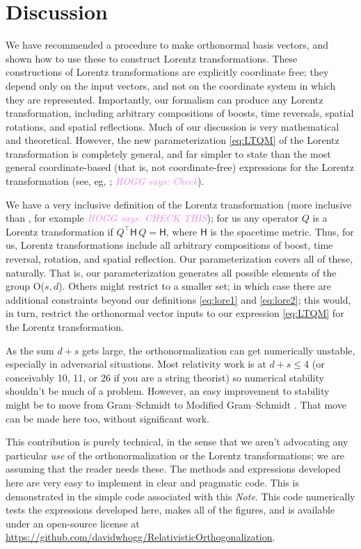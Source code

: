 \documentclass{article}
\newcommand{\metric}{\mathsf{H}}
\newcommand{\documentname}{\textsl{Note}}
\newcommand{\HOGG}[1]{\textcolor{violet}{\textsl{HOGG says: {#1}}}}
\begin{document}
\section{Discussion}\label{sec:discussion}

We have recommended a procedure to make orthonormal basis vectors, and shown how to use these to construct Lorentz transformations.
These constructions of Lorentz transformations are explicitly coordinate free; they depend only on the input vectors, and not on the coordinate system in which they are represented.
Importantly, our formalism can produce any Lorentz transformation, including arbitrary compositions of boosts, time reversals, spatial rotations, and spatial reflections.
Much of our discussion is very mathematical and theoretical.
However, the new parameterization \eqref{eq:LTQM} of the Lorentz transformation is completely general, and far simpler to state than the most general coordinate-based (that is, not coordinate-free) expressions for the Lorentz transformation (see, eg, \cite{haber}; \HOGG{Check}).

We have a very inclusive definition of the Lorentz transformation (more inclusive than \cite{haber}, for example \HOGG{CHECK THIS}); for us any operator $Q$ is a Lorentz transformation if $Q^\top\metric\,Q=\metric$, where $\metric$ is the spacetime metric.
Thus, for us, Lorentz transformations include all arbitrary compositions of boost, time reversal, rotation, and spatial reflection.
Our parameterization covers all of these, naturally.
That is, our parameterization generates all possible elements of the group O($s,d$).
Others might restrict to a smaller set; in which case there are additional constraints beyond our definitions \eqref{eq:lore1} and \eqref{eq:lore2}; this would, in turn, restrict the orthonormal vector inputs to our expression \eqref{eq:LTQM} for the Lorentz transformation.

As the sum $d+s$ gets large, the orthonormalization can get numerically unstable, especially in adversarial situations.
Most relativity work is at $d+s\leq 4$ (or conceivably 10, 11, or 26 if you are a string theorist) so numerical stability shouldn't be much of a problem.
However, an easy improvement to stability might be to move from Gram--Schmidt to Modified Gram--Schmidt \cite{modifiedgramschmidt}.
That move can be made here too, without significant work.

This contribution is purely technical, in the sense that we aren't advocating any particular \emph{use} of the orthonormalization or the Lorentz transformations; we are assuming that the reader needs these.
The methods and expressions developed here are very easy to implement in clear and pragmatic code.
This is demonstrated in the simple code associated with this \documentname.
This code numerically tests the expressions developed here, makes all of the figures, and is available under an open-source license at \url{https://github.com/davidwhogg/RelativisticOrthogonalization}.
\end{document}
